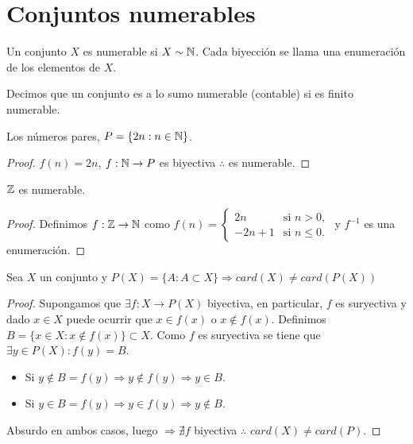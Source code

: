 \section{Conjuntos numerables}

\begin{definition}
	Un conjunto \(X\) es numerable si \(X \sim \mathbb{N} \). Cada biyección se llama una enumeración de los elementos de \(X\).
\end{definition}

\begin{definition}
	Decimos que un conjunto es a lo sumo numerable (contable) si es finito numerable.
\end{definition}

\begin{eg}
	Los números pares, \(P = \{ 2n:n \in \mathbb{N} \} \).
	\begin{proof}
		\(f(n) = 2n\), \(f: \mathbb{N} \to P\) es biyectiva \(\therefore \) es numerable.
	\end{proof}
\end{eg}

\begin{eg}
	\(\mathbb{Z} \) es numerable.
	\begin{proof}
		Definimos \(f: \mathbb{Z} \to \mathbb{N} \) como \(f(n) = \begin{cases}
			2n    & \text{si } n >0,     \\
			-2n+1 & \text{si } n \leq 0.
		\end{cases} \) y \(f^{-1} \) es una enumeración.
	\end{proof}
\end{eg}

\begin{theorem}
	Sea \(X\) un conjunto y \(P(X) = \{ A : A \subset X \} \Rightarrow card(X) \neq card(P(X))\)
	\begin{proof}
		Supongamos que \(\exists f:X \to P(X)\) biyectiva, en particular, \(f\) es suryectiva y dado \(x \in X \) puede ocurrir que \(x \in f(x)\) o \(x \notin f(x)\). Definimos \(B = \{ x \in X: x \notin f(x) \} \subset X\). Como \(f\) es suryectiva se tiene que \(\exists y \in P(X): f(y) = B\).\begin{itemize}
			\item Si \(y \notin B=f(y) \Rightarrow y \notin f(y) \Rightarrow y \in B\).
			\item Si \(y \in B = f(y) \Rightarrow y \in f(y) \Rightarrow y \notin B\).
		\end{itemize}
		Absurdo en ambos casos, luego \(\Rightarrow \nexists f\) biyectiva \(\therefore \) \(card(X) \neq card(P)\).
	\end{proof}
\end{theorem}

